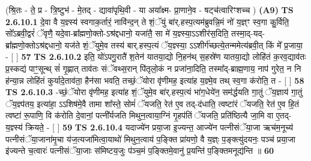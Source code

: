 \documentclass[17pt]{extarticle}
\begin{document}
                  \newline
                      (श्रि॒तः - ते॒ प्र - त्रि॒ष्टुभ॑ - मे॒तद् - द्यावा॑पृथि॒वी - या अया᳚क्ष्म- प्रा॒णाने॒व - षट्च॑त्वारिꣳशच्च ) \textbf{(A9)} \newline \newline
                                        \textbf{ TS 2.6.10.1} \newline
                  दे॒वा वै य॒ज्ञ्स्य॑ स्वगाक॒र्तारं॒ नावि॑न्द॒न् ते शं॒ॅयुं बा॑र्.हस्प॒त्यम॑ब्रुवन्नि॒मं नो॑ य॒ज्ञ्ꣳ स्व॒गा कु॒र्विति॒ सो᳚ऽब्रवी॒द्वरं॑ ॅवृणै॒ यदे॒वा-ब्रा᳚ह्मणो॒क्तो-ऽश्र॑द्दधानो॒ यजा॑तै॒ सा मे॑ य॒ज्ञ्स्या॒ऽऽशीर॑स॒दिति॒ तस्मा॒द्-यद्-ब्रा᳚ह्मणो॒क्तोऽश्र॑द्दधानो॒ यज॑ते शं॒ॅयुमे॒व तस्य॑ बार्.हस्प॒त्यं ॅय॒ज्ञ्स्या॒ ऽऽशीर्ग॑च्छत्ये॒तन्ममेत्य॑ब्रवी॒त् किं मे᳚ प्र॒जाया॒ - [  ] \textbf{  57} \newline
                  \newline
                                \textbf{ TS 2.6.10.2} \newline
                  इति॒ यो॑ऽपगु॒रातै॑ श॒तेन॑ यातया॒द्यो नि॒हन॑थ् स॒हस्रे॑ण यातया॒द्यो लोहि॑तं क॒रव॒द्याव॑तः प्र॒स्कद्य॑ पाꣳ॒॒सून्थ् सं॑ गृ॒ह्णात् ताव॑तः संॅवथ्स॒रान् पि॑तृलो॒कं न प्रजा॑ना॒दिति॒ तस्मा᳚द्-ब्राह्म॒णाय॒ नाप॑ गुरेत॒ न नि ह॑न्या॒न्न लोहि॑तं कुर्यादे॒ताव॑ता॒ हैन॑सा भवति॒ तच्छं॒ॅयोरा वृ॑णीमह॒ इत्या॑ह य॒ज्ञ्मे॒व तथ् स्व॒गा क॑रोति॒ त - [  ] \textbf{  58} \newline
                  \newline
                                \textbf{ TS 2.6.10.3} \newline
                  -च्छं॒ॅयोरा वृ॑णीमह॒ इत्या॑ह शं॒ॅयुमे॒व बा॑र्.हस्प॒त्यं भा॑ग॒धेये॑न॒ सम॑र्द्धयति गा॒तुं ॅय॒ज्ञाय॑ गा॒तुं ॅय॒ज्ञ्प॑तय॒ इत्या॑हा॒ ऽऽशिष॑मे॒वै तामा शा᳚स्ते॒ सोमं॑ ॅयजति॒ रेत॑ ए॒व तद्-द॑धाति॒ त्वष्टा॑रं ॅयजति॒ रेत॑ ए॒व हि॒तं त्वष्टा॑ रू॒पाणि॒ वि क॑रोति दे॒वानां॒ पत्नी᳚र्यजति मिथुन॒त्वाया॒ग्निं गृ॒हप॑तिं ॅयजति॒ प्रति॑ष्ठित्यै जा॒मि वा ए॒तद्-य॒ज्ञ्स्य॑ क्रियते॒ - [  ] \textbf{  59} \newline
                  \newline
                                \textbf{ TS 2.6.10.4} \newline
                  यदाज्ये॑न प्रया॒जा इ॒ज्यन्त॒ आज्ये॑न पत्नीसंॅया॒जा ऋच॑म॒नूच्य॑ पत्नीसंॅया॒जाना॑मृ॒चा य॑ज॒त्यजा॑मित्वा॒याथो॑ मिथुन॒त्वाय॑ प॒ङ्क्ति प्रा॑यणो॒ वै य॒ज्ञ्ः प॒ङ्क्त्यु॑दयनः॒ पञ्च॑ प्रया॒जा इ॑ज्यन्ते च॒त्वारः॑ पत्नीसंॅया॒जाः स॑मिष्टय॒जुः प॑ञ्च॒मं प॒ङ्क्तिमे॒वानु॑ प्र॒यन्ति॑ प॒ङ्क्तिमनूद्य॑न्ति ॥ \textbf{  60} \newline
\end{document}

